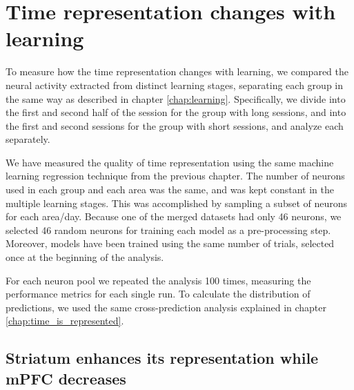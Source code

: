 \chapter{Time representation changes with learning}
\label{chap:rep_changes}

To measure how the time representation changes with learning, we compared the neural activity extracted from distinct learning stages, separating each group in the same way as described in chapter \ref{chap:learning}. Specifically, we divide into the first and second half of the session for the group with long sessions, and into the first and second sessions for the group with short sessions, and analyze each separately. 

We have measured the quality of time representation using the same machine learning regression technique from the previous chapter. The number of neurons used in each group and each area was the same, and was kept constant in the multiple learning stages. This was accomplished by sampling a subset of neurons for each area/day. Because one of the merged datasets had only 46 neurons, we selected 46 random neurons for training each model as a pre-processing step. Moreover, models have been trained using the same number of trials, selected once at the beginning of the analysis.

For each neuron pool we repeated the analysis 100 times, measuring the performance metrics for each single run. To calculate the distribution of predictions, we used the same cross-prediction analysis explained in chapter \ref{chap:time_is_represented}. 

\section{Striatum enhances its representation while mPFC decreases}

